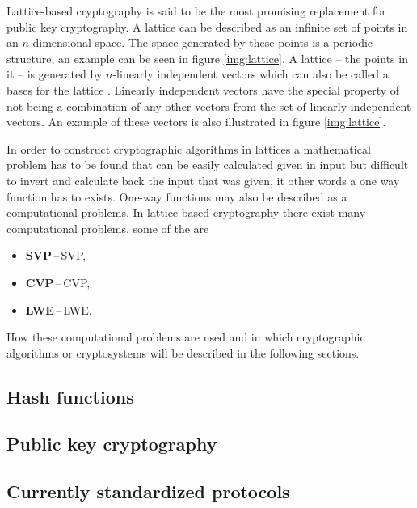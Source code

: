 Lattice-based cryptography is said to be the most promising replacement for public key cryptography. A lattice can be described as an infinite set of points in an $n$ dimensional space. The space generated by these points is a periodic structure, an example can be seen in figure \ref{img:lattice}. A lattice -- the points in it -- is generated by $n$-linearly independent vectors which can also be called a bases for the lattice \cite{Bernstein2009}. Linearly independent vectors have the special property of not being a combination of any other vectors from the set of linearly independent vectors. An example of these vectors is also illustrated in figure \ref{img:lattice}.


In order to construct cryptographic algorithms in lattices a mathematical problem has to be found that can be easily calculated given in input but difficult to invert and calculate back the input that was given, it other words a one way function has to exists. One-way functions may also be described as a computational problems. In lattice-based cryptography there exist many computational problems, some of the are
\begin{itemize}
  \item \textbf{SVP}\,--\,\acl{SVP},
  \item \textbf{CVP}\,--\,\acl{CVP},
  \item \textbf{LWE}\,--\,\acl{LWE}\cite{Bernstein2009}.
\end{itemize}
How these computational problems are used and in which cryptographic algorithms or cryptosystems will be described in the following sections.

\subsection{Hash functions}

\subsection{Public key cryptography}

\subsection{Currently standardized protocols}
